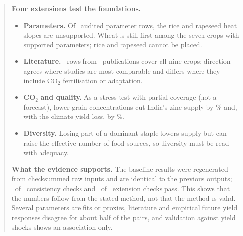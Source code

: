 \begin{abstract}
\noindent\textbf{Four extensions test the foundations.}
\begin{itemize}
\item \textbf{Parameters.} Of \parNRows\ audited parameter rows, the rice and rapeseed heat slopes are unsupported.
Wheat is still first among the seven crops with supported parameters; rice and rapeseed cannot be placed.
\item \textbf{Literature.} \litNRows\ rows from \litNStudies\ publications cover all nine crops; direction agrees where
studies are most comparable and differs where they include CO$_2$ fertilisation or adaptation.
\item \textbf{CO$_2$ and quality.} As a stress test with partial coverage (not a forecast), lower grain concentrations
cut India's zinc supply by \cotwoIndQualZincAbs\% and, with the climate yield loss, by \cotwoIndCombZincAbs\%.
\item \textbf{Diversity.} Losing part of a dominant staple lowers supply but can raise the effective number of food
sources, so diversity must be read with adequacy.
\end{itemize}

\noindent\textbf{What the evidence supports.} The baseline results were regenerated from checksummed raw inputs and are
identical to the previous outputs; \checksPassed\ of \checksN\ consistency checks and \extChecksPassed\ of
\extChecksN\ extension checks pass. This shows that the numbers follow from the stated method, not that the method is
valid. Several parameters are fits or proxies, literature and empirical future yield responses disagree for about half
of the pairs, and validation against yield shocks shows an association only.
\end{abstract}
